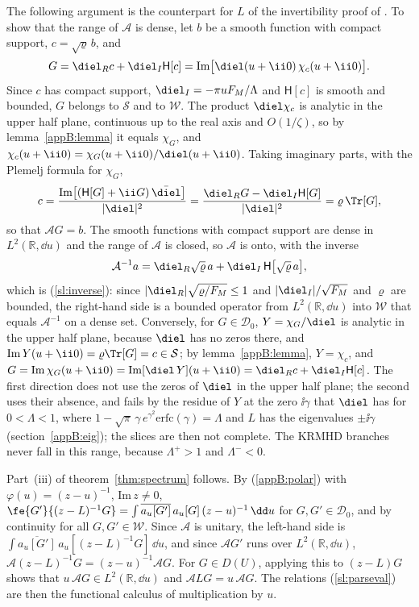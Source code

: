 The following argument is the counterpart for $L$ of the invertibility proof of \citet{Morrison2000}. To show that the range of $\mathcal A$ is dense, let $b$ be a smooth function with compact support, $c=\sqrt\varrho\,b$, and
\begin{equation*}
  G=\diel_Rc+\diel_I\mathsf H[c]=\mathrm{Im}\big[\diel(u+\ii0)\,\chi_c(u+\ii0)\big].
\end{equation*}
Since $c$ has compact support, $\diel_I=-\pi uF_M/\Lambda$ and $\mathsf H[c]$ is smooth and bounded, $G$ belongs to $\mathcal S$ and to $\mathcal W$. The product $\diel\chi_c$ is analytic in the upper half plane, continuous up to the real axis and $O(1/\zeta)$, so by lemma~\ref{appB:lemma} it equals $\chi_G$, and $\chi_c(u+\ii0)=\chi_G(u+\ii0)/\diel(u+\ii0)$. Taking imaginary parts, with the Plemelj formula for $\chi_G$,
\begin{equation*}
  c=\frac{\mathrm{Im}\big[(\mathsf H[G]+\ii G)\,\bar\diel\big]}{|\diel|^2}=\frac{\diel_RG-\diel_I\mathsf H[G]}{|\diel|^2}=\varrho\,\Tr[G],
\end{equation*}
so that $\mathcal AG=b$. The smooth functions with compact support are dense in $L^2(\mathbb R,\dd u)$ and the range of $\mathcal A$ is closed, so $\mathcal A$ is onto, with the inverse
\begin{equation}\label{appB:inv}
  \mathcal A^{-1}a=\diel_R\sqrt\varrho\,a+\diel_I\,\mathsf H\big[\sqrt\varrho\,a\big],
\end{equation}
which is (\ref{sl:inverse}): since $|\diel_R|\sqrt{\varrho/F_M}\le1$ and $|\diel_I|/\sqrt{F_M}$ and $\varrho$ are bounded, the right-hand side is a bounded operator from $L^2(\mathbb R,\dd u)$ into $\mathcal W$ that equals $\mathcal A^{-1}$ on a dense set. Conversely, for $G\in\mathcal D_0$, $Y=\chi_G/\diel$ is analytic in the upper half plane, because $\diel$ has no zeros there, and $\mathrm{Im}\,Y(u+\ii0)=\varrho\Tr[G]=c\in\mathcal S$; by lemma~\ref{appB:lemma}, $Y=\chi_c$, and $G=\mathrm{Im}\,\chi_G(u+\ii0)=\mathrm{Im}[\diel\,Y](u+\ii0)=\diel_Rc+\diel_I\mathsf H[c]$. The first direction does not use the zeros of $\diel$ in the upper half plane; the second uses their absence, and fails by the residue of $Y$ at the zero $\ii\gamma$ that $\diel$ has for $0<\Lambda<1$, where $1-\sqrt\pi\,\gamma\,e^{\gamma^2}\mathrm{erfc}(\gamma)=\Lambda$ and $L$ has the eigenvalues $\pm\ii\gamma$ (section~\ref{appB:eig}); the slices are then not complete. The KRMHD branches never fall in this range, because $\Lambda^+>1$ and $\Lambda^-<0$.

Part~(iii) of theorem~\ref{thm:spectrum} follows. By (\ref{appB:polar}) with $\varphi(u)=(z-u)^{-1}$, $\mathrm{Im}\,z\neq0$, $\fe{G'}{(z-L)^{-1}G}=\int\overline{a_u[G']}\,a_u[G]\,(z-u)^{-1}\,\dd u$ for $G,G'\in\mathcal D_0$, and by continuity for all $G,G'\in\mathcal W$. Since $\mathcal A$ is unitary, the left-hand side is $\int\overline{a_u[G']}\,a_u[(z-L)^{-1}G]\,\dd u$, and since $\mathcal AG'$ runs over $L^2(\mathbb R,\dd u)$, $\mathcal A(z-L)^{-1}G=(z-u)^{-1}\mathcal AG$. For $G\in D(U)$, applying this to $(z-L)G$ shows that $u\,\mathcal AG\in L^2(\mathbb R,\dd u)$ and $\mathcal ALG=u\,\mathcal AG$. The relations (\ref{sl:parseval}) are then the functional calculus of multiplication by $u$.

